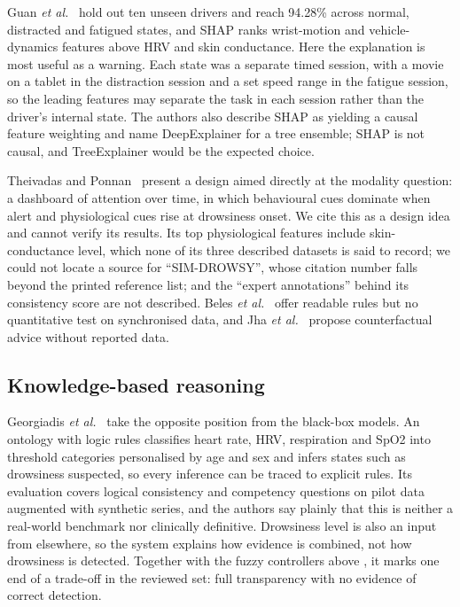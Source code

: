 Guan \textit{et al.}~\cite{guan2025fatigue} hold out ten unseen drivers and reach 94.28\% across normal, distracted and fatigued states, and SHAP ranks wrist-motion and vehicle-dynamics features above HRV and skin conductance. Here the explanation is most useful as a warning. Each state was a separate timed session, with a movie on a tablet in the distraction session and a set speed range in the fatigue session, so the leading features may separate the task in each session rather than the driver's internal state. The authors also describe SHAP as yielding a causal feature weighting and name DeepExplainer for a tree ensemble; SHAP is not causal, and TreeExplainer would be the expected choice.

Theivadas and Ponnan~\cite{theivadas2025dynamic} present a design aimed directly at the modality question: a dashboard of attention over time, in which behavioural cues dominate when alert and physiological cues rise at drowsiness onset. We cite this as a design idea and cannot verify its results. Its top physiological features include skin-conductance level, which none of its three described datasets is said to record; we could not locate a source for ``SIM-DROWSY'', whose citation number falls beyond the printed reference list; and the ``expert annotations'' behind its consistency score are not described. Beles \textit{et al.}~\cite{beles2024driver} offer readable rules but no quantitative test on synchronised data, and Jha \textit{et al.}~\cite{jha2025realtime} propose counterfactual advice without reported data.

\subsection{Knowledge-based reasoning}
Georgiadis \textit{et al.}~\cite{georgiadis2026timeaware} take the opposite position from the black-box models. An ontology with logic rules classifies heart rate, HRV, respiration and SpO2 into threshold categories personalised by age and sex and infers states such as drowsiness suspected, so every inference can be traced to explicit rules. Its evaluation covers logical consistency and competency questions on pilot data augmented with synthetic series, and the authors say plainly that this is neither a real-world benchmark nor clinically definitive. Drowsiness level is also an input from elsewhere, so the system explains how evidence is combined, not how drowsiness is detected. Together with the fuzzy controllers above \cite{hu2026human,yan2026toward}, it marks one end of a trade-off in the reviewed set: full transparency with no evidence of correct detection.
